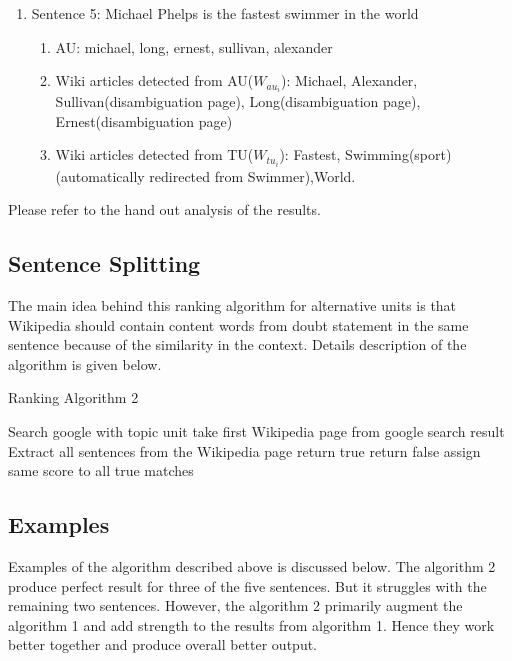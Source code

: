 \documentclass[11pt]{article}
\begin{document}
\begin{enumerate}
\begin{enumerate}
\end{enumerate}


\item Sentence 5: Michael Phelps is the fastest swimmer in the world
\begin{enumerate}
\item AU: michael, long, ernest, sullivan, alexander
\item Wiki articles detected from AU($W_{au_{i}}$): Michael, Alexander, Sullivan(disambiguation page), Long(disambiguation page), Ernest(disambiguation page) 
\item Wiki articles detected from TU($W_{tu_{i}}$): Fastest, Swimming(sport) (automatically redirected from Swimmer),World.

\end{enumerate}


\end{enumerate}

Please refer to the hand out analysis of the results.


\subsection{Sentence Splitting}

The main idea behind this ranking algorithm for alternative units is that Wikipedia should contain content words from doubt statement in the same sentence because of the similarity in the context. Details description of the algorithm is given below.


\begin{algorithm}
\small
\caption{Ranking Algorithm 2}
\label{alg:AssignScore} 
\begin{algorithmic}
\STATE Search google with topic unit
\STATE take first Wikipedia page from google search result
\STATE Extract all sentences from the Wikipedia page
				\STATE return true
			\ELSE
				\STATE return false	
			\ENDIF
		\ENDIF
	\ENDFOR
\ENDFOR		
\STATE assign same score to all true matches

\end{algorithmic}
\end{algorithm}

\subsection{Examples}
Examples of the algorithm described above is discussed below. The algorithm 2 produce perfect result for three of the five sentences. But it struggles with the remaining two sentences. However, the algorithm 2 primarily augment the algorithm 1 and add strength to the results from algorithm 1. Hence they work better together and produce overall better output.
\end{document}
